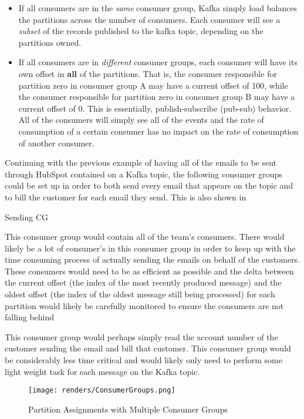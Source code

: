 \begin{itemize}
\item{If all consumers are in the \textit{same} consumer group, Kafka simply load balances the partitions across the number of consumers}. Each consumer will see a \textit{subset} of the records published to the kafka topic, depending on the partitions owned.
\item{If all consumers are in \textit{different} consumer groups, each consumer will have its own offset in \textbf{all} of the partitions. That is, the consumer responsible for partition zero in consumer group A may have a current offset of 100, while the consumer responsible for partition zero in consumer group B may have a current offset of 0. This is essentially, publish-subscribe (pub-sub) behavior. All of the consumers will simply see all of the events and the rate of consumption of a certain consumer has no impact on the rate of consumption of another consumer.}
\end{itemize}

Continuing with the previous example of having all of the emails to be sent through HubSpot contained on a Kafka topic, the following consumer groups could be set up in order to both send every email that appears on the topic and to bill the customer for each email they send. This is also shown in 
\begin{labeling}{Sending CG}
\item[Sending CG]{This consumer group would contain all of the \team{} team's consumers. There would likely be a lot of consumer's in this consumer group in order to keep up with the time consuming process of actually sending the emails on behalf of the customers. These consumers would need to be as efficient as possible and the delta between the current offset (the index of the most recently produced message) and the oldest offset (the index of the oldest message still being processed) for each partition would likely be carefully monitored to ensure the consumers are not falling behind}
\item[Billing CG]{This consumer group would perhaps simply read the account number of the customer sending the email and bill that customer. This consumer group would be considerably less time critical and would likely only need to perform some light weight task for each message on the Kafka topic.}
\end{labeling}


\begin{figure}[H]
      \centering
      \texttt{[image: renders/ConsumerGroups.png]}
      \caption{Partition Assignments with Multiple Consumer Groups}
      \label{fig:consumerGroups}
\end{figure}  

